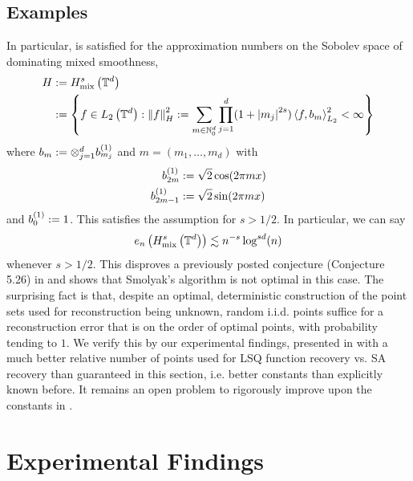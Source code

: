 \documentclass[12pt, oneside]{amsart}
\theoremstyle{definition}
\theoremstyle{remark}
\numberwithin{equation}{section}
\begin{document}
\subsection*{Examples}
In particular,  is satisfied for the 
approximation numbers on the Sobolev space of dominating mixed smoothness, 
\begin{align*}
    H &\defn H_{\text{mix}}^s\left(\T^d\right)\\
    &\defn \set{f \in L_2\left(\T^d\right) : \norm[H]{f}^2 \defn \sum_{m \in 
    \N_0^d} \prod_{j=1}^d (1+\abs{m_j}^{2s}) \inner{f}{b_m}^2_{L_2} < \infty}
\end{align*}
where \(b_m \defn \otimes_{j=1}^d b_{m_j}^{(1)}\) and \(m = (m_1, \dots, m_d)\) with \begin{align*}
    b_{2m}^{(1)} &\defn \sqrt{2}\cos(2\pi m x)\\
    b_{2m-1}^{(1)} &\defn \sqrt{2}\sin(2\pi m x)
\end{align*}
and \(b_0^{(1)} \defn 1\). This satisfies the assumption for \(s > 1/2\). In 
particular, we can say
\begin{equation}\label{eq:conclusio}
    e_n\left( H_{\text{mix}}^s\left(\T^d\right) \right) \lesssim n^{-s}\log^{sd}(n)
\end{equation}
whenever \(s > 1/2\). This disproves a previously posted conjecture (Conjecture 
5.26) in \cite{Dung_Temlyakov_Ullrich_2018} and shows that Smolyak's algorithm 
is not optimal in this case. The surprising fact is that, despite an optimal, 
deterministic construction of the point sets used for reconstruction being 
unknown, random i.i.d. points suffice for a reconstruction error that is on the 
order of optimal points, with probability tending to \(1\). We verify this by 
our experimental findings, presented in  with a 
much better relative number of points used for LSQ function recovery vs. SA 
recovery than guaranteed in this section, i.e. better constants than explicitly 
known before. It remains an open problem to rigorously improve upon the 
constants in .

\section{Experimental Findings}\label{sec:experimentalFindings}

\end{document}
